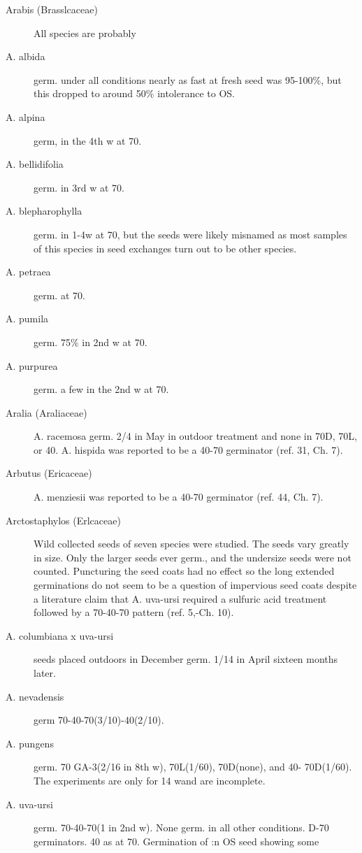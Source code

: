 \begin{description}
\item[Arabis (Brasslcaceae)] All species are probably
\item[A. albida] germ. under all conditions nearly as fast at
fresh seed was 95-100\%, but this dropped to around 50\%
intolerance to OS.
\item[A. alpina] germ, in the 4th w at 70.
\item[A. bellidifolia] germ. in 3rd w at 70.
\item[A. blepharophylla] germ. in 1-4w at 70, but the seeds were likely misnamed as
most samples of this species in seed exchanges turn out to be other species.
\item[A. petraea] germ. at 70.
\item[A. pumila] germ. 75\% in 2nd w at 70.
\item[A. purpurea] germ. a few in the 2nd w at 70.
\item[Aralia (Araliaceae)] A. racemosa germ. 2/4 in May in outdoor treatment
and none in 70D, 70L, or 40. A. hispida was reported to be a 40-70 germinator (ref.
31, Ch. 7).

\item[Arbutus (Ericaceae)] A. menziesii was reported to be a 40-70 germinator
(ref. 44, Ch. 7).
\item[Arctostaphylos (Erlcaceae)] Wild collected seeds of seven species were
studied. The seeds vary greatly in size. Only the larger seeds ever germ., and the
undersize seeds were not counted. Puncturing the seed coats had no effect so the
long extended germinations do not seem to be a question of impervious seed coats
despite a literature claim that A. uva-ursi required a sulfuric acid treatment followed by
a 70-40-70 pattern (ref. 5,-Ch. 10).
\item[A. columbiana x uva-ursi] seeds placed outdoors in December germ. 1/14 in
April sixteen months later.
\item[A. nevadensis] germ 70-40-70(3/10)-40(2/10).
\item[A. pungens] germ. 70 GA-3(2/16 in 8th w), 70L(1/60), 70D(none), and 40-
70D(1/60). The experiments are only for 14 wand are incomplete.
\item[A. uva-ursi] germ. 70-40-70(1 in 2nd w). None germ. in all other conditions.
D-70 germinators.
40 as at 70. Germination of
:n OS seed showing some


\end{description}
